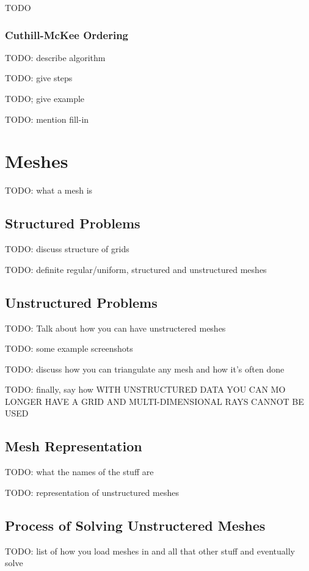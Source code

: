 \documentclass{article}
\begin{document}
TODO

\subsubsection{Cuthill-McKee Ordering}

TODO: describe algorithm

TODO: give steps

TODO; give example

TODO: mention fill-in

\section{Meshes}

TODO: what a mesh is

\subsection{Structured Problems}

TODO: discuss structure of grids

TODO: definite regular/uniform, structured and unstructured meshes

\subsection{Unstructured Problems}

TODO: Talk about how you can have unstructered meshes

TODO: some example screenshots

TODO: discuss how you can triangulate any mesh and how it's often done

TODO: finally, say how WITH UNSTRUCTURED DATA YOU CAN MO LONGER HAVE A GRID AND MULTI-DIMENSIONAL RAYS CANNOT BE USED

\subsection{Mesh Representation}

TODO: what the names of the stuff are 

TODO: representation of unstructured meshes

\subsection{Process of Solving Unstructered Meshes}

TODO: list of how you load meshes in and all that other stuff and eventually solve
\end{document}
